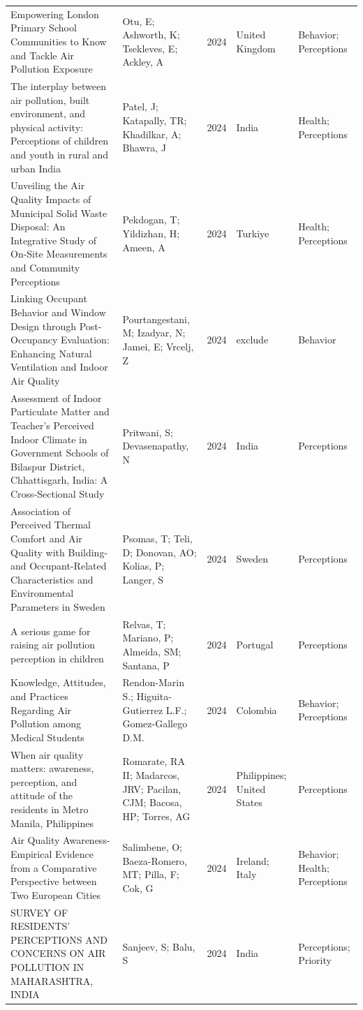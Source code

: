 {\begin{longtable}[t]{p{6cm}p{3cm}lp{3cm}p{3cm}}
Empowering London Primary School Communities to Know and Tackle Air Pollution Exposure & Otu, E; Ashworth, K; Tsekleves, E; Ackley, A & 2024 & United Kingdom & Behavior; Perceptions\\
The interplay between air pollution, built environment, and physical activity: Perceptions of children and youth in rural and urban India & Patel, J; Katapally, TR; Khadilkar, A; Bhawra, J & 2024 & India & Health; Perceptions\\
Unveiling the Air Quality Impacts of Municipal Solid Waste Disposal: An Integrative Study of On-Site Measurements and Community Perceptions & Pekdogan, T; Yildizhan, H; Ameen, A & 2024 & Turkiye & Health; Perceptions\\
Linking Occupant Behavior and Window Design through Post-Occupancy Evaluation: Enhancing Natural Ventilation and Indoor Air Quality & Pourtangestani, M; Izadyar, N; Jamei, E; Vrcelj, Z & 2024 & exclude & Behavior\\
\addlinespace
Assessment of Indoor Particulate Matter and Teacher's Perceived Indoor Climate in Government Schools of Bilaspur District, Chhattisgarh, India: A Cross-Sectional Study & Pritwani, S; Devasenapathy, N & 2024 & India & Perceptions\\
Association of Perceived Thermal Comfort and Air Quality with Building- and Occupant-Related Characteristics and Environmental Parameters in Sweden & Psomas, T; Teli, D; Donovan, AO; Kolias, P; Langer, S & 2024 & Sweden & Perceptions\\
A serious game for raising air pollution perception in children & Relvas, T; Mariano, P; Almeida, SM; Santana, P & 2024 & Portugal & Perceptions\\
Knowledge, Attitudes, and Practices Regarding Air Pollution among Medical Students & Rendon-Marin S.; Higuita-Gutierrez L.F.; Gomez-Gallego D.M. & 2024 & Colombia & Behavior; Perceptions\\
When air quality matters: awareness, perception, and attitude of the residents in Metro Manila, Philippines & Romarate, RA II; Madarcos, JRV; Pacilan, CJM; Bacosa, HP; Torres, AG & 2024 & Philippines; United States & Perceptions\\
\addlinespace
Air Quality Awareness-Empirical Evidence from a Comparative Perspective between Two European Cities & Salimbene, O; Baeza-Romero, MT; Pilla, F; Cok, G & 2024 & Ireland; Italy & Behavior; Health; Perceptions\\
SURVEY OF RESIDENTS' PERCEPTIONS AND CONCERNS ON AIR POLLUTION IN MAHARASHTRA, INDIA & Sanjeev, S; Balu, S & 2024 & India & Perceptions; Priority\\

\end{longtable}}
